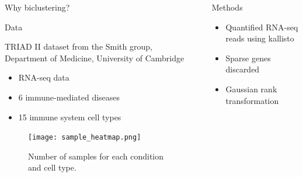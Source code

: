 \documentclass[final]{beamer}
\newlength{\sepwid}
\newlength{\onecolwid}
\begin{document}
\begin{frame}[t]
\begin{columns}[t]
\begin{column}{\onecolwid}
\begin{block}{Why biclustering?}
\end{block}







\begin{block}{Data}

TRIAD II dataset from the Smith group, Department of Medicine, University of Cambridge
\begin{itemize}
\setlength{\itemindent}{2em}
\item{RNA-seq data}
\item{6 immune-mediated diseases}
\item{15 immune system cell types}
\end{itemize}

\vspace{20px}
\begin{figure}[h]
\centering
\texttt{[image: sample\_heatmap.png]}
\caption{Number of samples for each condition and cell type.}
\label{fig:sample_heatmap}
\end{figure}

\end{block}



\end{column} %

\begin{column}{\sepwid}\end{column} %

\begin{column}{\onecolwid} %




\begin{block}{Methods}

\begin{itemize}
\setlength{\itemindent}{2em}
\item{Quantified RNA-seq reads using kallisto \cite{Bray_2016}}
\item{Sparse genes discarded}
\item{Gaussian rank transformation}
\end{itemize}


\end{block}
\end{column}
\end{columns}
\end{frame}
\end{document}
